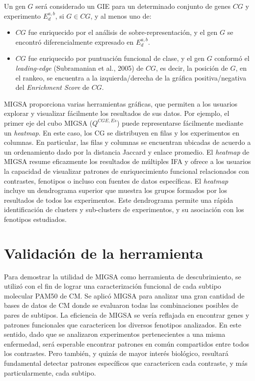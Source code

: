 \documentclass[12pt,twoside]{reedthesis}
\providecommand{\tightlist}{%
  \setlength{\itemsep}{0pt}\setlength{\parskip}{0pt}}
\begin{document}
\par

Un gen \(G\) será considerado un GIE para un determinado conjunto de genes \(CG\) y experimento \(E_{d}^{a,b}\), si \(G \in CG\), y al menos uno de:
\begin{itemize}
\tightlist
\item
  \(CG\) fue enriquecido por el análisis de sobre-representación, y el gen \(G\) se encontró diferencialmente expresado en \(E_{d}^{a,b}\).
\item
  \(CG\) fue enriquecido por puntuación funcional de clase, y el gen \(G\) conformó el \emph{leading-edge} (Subramanian et al., 2005) de \(CG\), es decir, la posición de \(G\), en el rankeo, se encuentra a la izquierda/derecha de la gráfica positiva/negativa del \emph{Enrichment Score} de \(CG\).
\end{itemize}
\par

MIGSA proporciona varias herramientas gráficas, que permiten a los usuarios explorar y visualizar fácilmente los resultados de sus datos. Por ejemplo, el primer eje del cubo MIGSA (\(Q^{CGE,Es}\)) puede representarse fácilmente mediante un \emph{heatmap}. En este caso, los CG se distribuyen en filas y los experimentos en columnas. En particular, las filas y columnas se encuentran ubicadas de acuerdo a un ordenamiento dado por la distancia Jaccard y enlace promedio. El \emph{heatmap} de MIGSA resume eficazmente los resultados de múltiples IFA y ofrece a los usuarios la capacidad de visualizar patrones de enriquecimiento funcional relacionados con contrastes, fenotipos o incluso con fuentes de datos específicas. El \emph{heatmap} incluye un dendrograma superior que muestra los grupos formados por los resultados de todos los experimentos. Este dendrograma permite una rápida identificación de clusters y sub-clusters de experimentos, y su asociación con los fenotipos estudiados.

\hypertarget{validacion-de-la-herramienta}{%
\section{Validación de la herramienta}\label{validacion-de-la-herramienta}}

\par

Para demostrar la utilidad de MIGSA como herramienta de descubrimiento, se utilizó con el fin de lograr una caracterización funcional de cada subtipo molecular PAM50 de CM. Se aplicó MIGSA para analizar una gran cantidad de bases de datos de CM donde se evaluaron todas las combinaciones posibles de pares de subtipos. La eficiencia de MIGSA se vería reflajada en encontrar genes y patrones funcionales que caractericen los diversos fenotipos analizados. En este sentido, dado que se analizaron experimentos pertenecientes a una misma enfermedad, será esperable encontrar patrones en común compartidos entre todos los contrastes. Pero también, y quizás de mayor interés biológico, resultará fundamental detectar patrones específicos que caractericen cada contraste, y más particularmente, cada subtipo.
\end{document}
